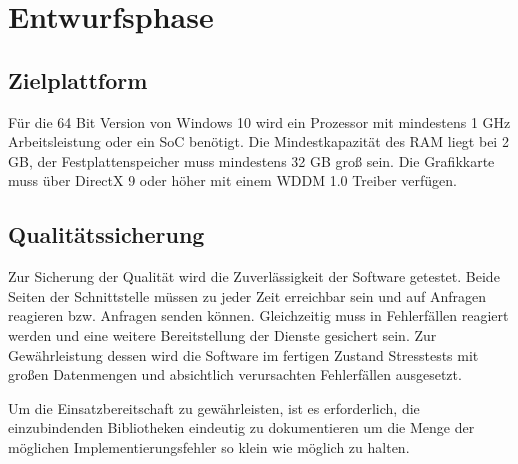 \section{Entwurfsphase}
\label{sec:Entwurfsphase}

\subsection{Zielplattform}
\label{sec:Zielplattform}
Für die 64 Bit Version von Windows 10 wird ein Prozessor mit mindestens 1 GHz Arbeitsleistung oder ein {\acs{SoC}} benötigt. Die Mindestkapazität des RAM liegt bei 2 GB, der Festplattenspeicher muss mindestens 32 GB groß sein. Die Grafikkarte muss über DirectX 9 oder höher mit einem {\acs{WDDM}} 1.0 Treiber verfügen.

\subsection{Qualitätssicherung}
\label{sec:Qualitätssicherung}
Zur Sicherung der Qualität wird die Zuverlässigkeit der Software getestet. Beide Seiten der Schnittstelle müssen zu jeder Zeit erreichbar sein und auf Anfragen reagieren bzw. Anfragen senden können. Gleichzeitig muss in Fehlerfällen reagiert werden und eine weitere Bereitstellung der Dienste gesichert sein. Zur Gewährleistung dessen wird die Software im fertigen Zustand Stresstests mit großen Datenmengen und absichtlich verursachten Fehlerfällen ausgesetzt. 

Um die Einsatzbereitschaft zu gewährleisten, ist es erforderlich, die einzubindenden Bibliotheken eindeutig zu dokumentieren um die Menge der möglichen Implementierungsfehler so klein wie möglich zu halten.